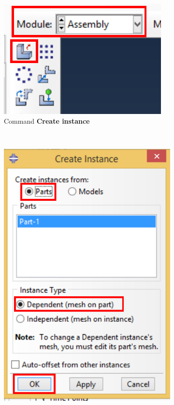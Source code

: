 \begin{figure}[H]
  \centering
  \begin{subfigure}{0.25\textwidth}
    \includegraphics[width=\textwidth]{./body/images/imagen22.pdf}
    \caption{Command \textbf{Create instance}}
    \label{figu22}
  \end{subfigure}%
  ~ %
  \begin{subfigure}{0.42\textwidth}
    \includegraphics[width=\textwidth]{./body/images/imagen23.pdf}

\end{subfigure}
\end{figure}
